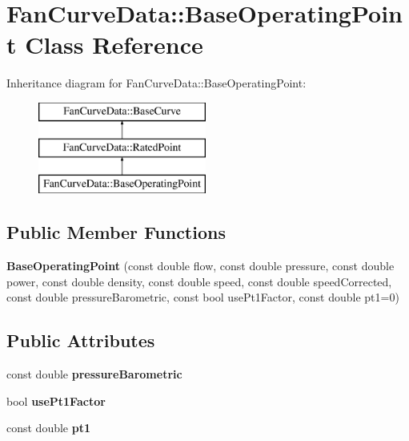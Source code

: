 \hypertarget{class_fan_curve_data_1_1_base_operating_point}{}\section{Fan\+Curve\+Data\+:\+:Base\+Operating\+Point Class Reference}
\label{class_fan_curve_data_1_1_base_operating_point}
Inheritance diagram for Fan\+Curve\+Data\+:\+:Base\+Operating\+Point\+:\begin{figure}[H]
\begin{center}
\leavevmode
\includegraphics[height=3.000000cm]{d7/d65/class_fan_curve_data_1_1_base_operating_point}
\end{center}
\end{figure}
\subsection*{Public Member Functions}
\begin{DoxyCompactItemize}
\item 
\mbox{\label{class_fan_curve_data_1_1_base_operating_point_a0260135ed464bc91143c620a1eeed78d}} 
{\bfseries Base\+Operating\+Point} (const double flow, const double pressure, const double power, const double density, const double speed, const double speed\+Corrected, const double pressure\+Barometric, const bool use\+Pt1\+Factor, const double pt1=0)
\end{DoxyCompactItemize}
\subsection*{Public Attributes}
\begin{DoxyCompactItemize}
\item 
\mbox{\label{class_fan_curve_data_1_1_base_operating_point_ab66cd337152255bf82b7ef98f828144b}} 
const double {\bfseries pressure\+Barometric}
\item 
\mbox{\label{class_fan_curve_data_1_1_base_operating_point_a4d09155765f22458b9feb10d77a188de}} 
bool {\bfseries use\+Pt1\+Factor}
\item 
\mbox{\label{class_fan_curve_data_1_1_base_operating_point_ab349de155902de5f1a2c6dc6f48191b3}} 
const double {\bfseries pt1}
\end{DoxyCompactItemize}
